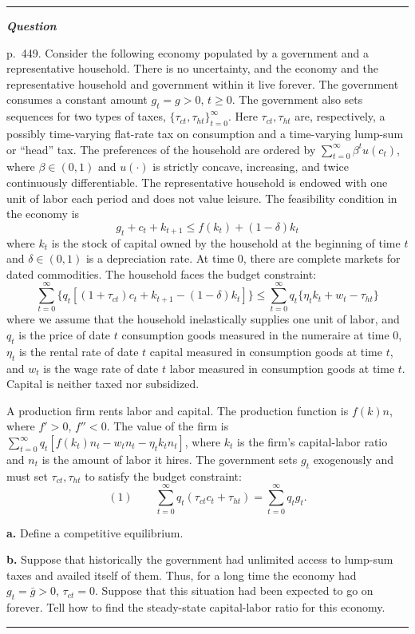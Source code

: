 \documentclass[12pt, letterpaper]{article}
\newenvironment{longquestion}{\par\small\noindent\textcolor{gray!60}{\rule{\linewidth}{0.4pt}}\par\nobreak
  \noindent\textcolor{gray!60!black}{\bfseries\textit{Question}}\par\nobreak}{\par\noindent
  \textcolor{gray!60}{\rule{\linewidth}{0.4pt}}\par}
\begin{document}
\begin{tcolorbox}[oddbox,title={Exercise 11.1 \quad Tax reform: I}]
\begin{longquestion}
p.~449. Consider the following economy populated by a government and a representative household. There is no
uncertainty, and the economy and the representative household and government within it live forever. The government
consumes a constant amount $g_t=g>0$, $t\ge0$. The government also sets sequences for two types of taxes,
$\{\tau_{ct},\tau_{ht}\}_{t=0}^\infty$. Here $\tau_{ct},\tau_{ht}$ are, respectively, a possibly time-varying flat-rate tax
on consumption and a time-varying lump-sum or ``head'' tax. The preferences of the household are ordered by
$\sum_{t=0}^\infty\beta^tu(c_t)$, where $\beta\in(0,1)$ and $u(\cdot)$ is strictly concave, increasing, and twice
continuously differentiable. The representative household is endowed with one unit of labor each period and does not
value leisure. The feasibility condition in the economy is
\[
g_t+c_t+k_{t+1}\le f(k_t)+(1-\delta)k_t
\]
where $k_t$ is the stock of capital owned by the household at the beginning of time $t$ and $\delta\in(0,1)$ is a
depreciation rate. At time 0, there are complete markets for dated commodities. The household faces the budget
constraint:
\[
\sum_{t=0}^\infty\{q_t[(1+\tau_{ct})c_t+k_{t+1}-(1-\delta)k_t]\}\le\sum_{t=0}^\infty q_t\{\eta_tk_t+w_t-\tau_{ht}\}
\]
where we assume that the household inelastically supplies one unit of labor, and $q_t$ is the price of date $t$
consumption goods measured in the numeraire at time 0, $\eta_t$ is the rental rate of date $t$ capital measured in
consumption goods at time $t$, and $w_t$ is the wage rate of date $t$ labor measured in consumption goods at time $t$.
Capital is neither taxed nor subsidized.

A production firm rents labor and capital. The production function is $f(k)n$, where $f'>0$, $f''<0$. The value of the
firm is $\sum_{t=0}^\infty q_t[f(k_t)n_t-w_tn_t-\eta_tk_tn_t]$, where $k_t$ is the firm's capital-labor ratio and $n_t$ is
the amount of labor it hires. The government sets $g_t$ exogenously and must set $\tau_{ct},\tau_{ht}$ to satisfy the
budget constraint:
\[
(1)\qquad\sum_{t=0}^\infty q_t(\tau_{ct}c_t+\tau_{ht})=\sum_{t=0}^\infty q_tg_t.
\]

\textbf{a.} Define a competitive equilibrium.

\textbf{b.} Suppose that historically the government had unlimited access to lump-sum taxes and availed itself of them.
Thus, for a long time the economy had $g_t=\bar g>0$, $\tau_{ct}=0$. Suppose that this situation had been expected to go on
forever. Tell how to find the steady-state capital-labor ratio for this economy.


\end{longquestion}
\end{tcolorbox}
\end{document}
